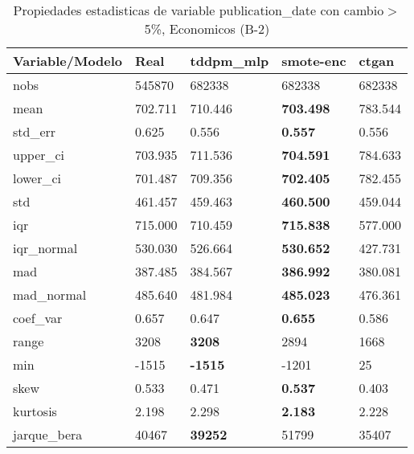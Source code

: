 \begin{table}[H]
\centering
\fontsize{8}{14}\selectfont
\caption{Propiedades estadisticas de variable publication\_date con cambio\ensuremath{>}5\%, Economicos (B-2)}
\label{table-stats-economicos-b-2-publication_date-short}
\begin{tabular}{|l|m{10em}|m{10em}|m{10em}|m{10em}|}
\hline
 \rowcolor[gray]{0.8}
Variable/Modelo & Real & tddpm\_mlp & smote-enc & ctgan \\
\hline nobs & 545870 & 682338 & 682338 & 682338 \\
\hline mean & 702.711 & 710.446 & \bfseries 703.498 & \cellcolor[rgb]{0.9, 0.54, 0.52} 783.544 \\
\hline std\_err & 0.625 & 0.556 & \bfseries 0.557 & \cellcolor[rgb]{0.9, 0.54, 0.52} 0.556 \\
\hline upper\_ci & 703.935 & 711.536 & \bfseries 704.591 & \cellcolor[rgb]{0.9, 0.54, 0.52} 784.633 \\
\hline lower\_ci & 701.487 & 709.356 & \bfseries 702.405 & \cellcolor[rgb]{0.9, 0.54, 0.52} 782.455 \\
\hline std & 461.457 & 459.463 & \bfseries 460.500 & \cellcolor[rgb]{0.9, 0.54, 0.52} 459.044 \\
\hline iqr & 715.000 & 710.459 & \bfseries 715.838 & \cellcolor[rgb]{0.9, 0.54, 0.52} 577.000 \\
\hline iqr\_normal & 530.030 & 526.664 & \bfseries 530.652 & \cellcolor[rgb]{0.9, 0.54, 0.52} 427.731 \\
\hline mad & 387.485 & 384.567 & \bfseries 386.992 & \cellcolor[rgb]{0.9, 0.54, 0.52} 380.081 \\
\hline mad\_normal & 485.640 & 481.984 & \bfseries 485.023 & \cellcolor[rgb]{0.9, 0.54, 0.52} 476.361 \\
\hline coef\_var & 0.657 & 0.647 & \bfseries 0.655 & \cellcolor[rgb]{0.9, 0.54, 0.52} 0.586 \\
\hline range & 3208 & \bfseries 3208 & 2894 & \cellcolor[rgb]{0.9, 0.54, 0.52} 1668 \\
\hline min & -1515 & \bfseries -1515 & -1201 & \cellcolor[rgb]{0.9, 0.54, 0.52} 25 \\
\hline skew & 0.533 & 0.471 & \bfseries 0.537 & \cellcolor[rgb]{0.9, 0.54, 0.52} 0.403 \\
\hline kurtosis & 2.198 & \cellcolor[rgb]{0.9, 0.54, 0.52} 2.298 & \bfseries 2.183 & 2.228 \\
\hline jarque\_bera & 40467 & \bfseries 39252 & \cellcolor[rgb]{0.9, 0.54, 0.52} 51799 & 35407 \\

\end{tabular}
\end{table}
